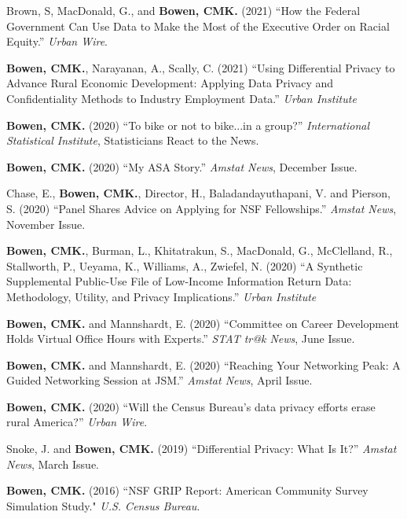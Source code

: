 \documentclass[11.5pt, letterpaper, roman]{moderncv} %
\begin{document}
\begin{etaremune}[topsep=0pt, itemsep=8pt, partopsep=0pt, parsep=0pt]
    \item Brown, S, MacDonald, G., and \textbf{Bowen, CMK.} (2021) ``How the Federal Government Can Use Data to Make the Most of the Executive Order on Racial Equity.'' \textit{Urban Wire}. 

    \item \textbf{Bowen, CMK.}, Narayanan, A., Scally, C. (2021) ``Using Differential Privacy to Advance Rural Economic Development: Applying Data Privacy and Confidentiality Methods to Industry Employment Data.'' \textit{Urban Institute}

    \item \textbf{Bowen, CMK.} (2020) ``To bike or not to bike...in a group?'' \textit{International Statistical Institute}, Statisticians React to the News.

    \item \textbf{Bowen, CMK.} (2020) ``My ASA Story.'' \textit{Amstat News}, December Issue.

    \item Chase, E., \textbf{Bowen, CMK.}, Director, H., Baladandayuthapani, V. and Pierson, S. (2020) ``Panel Shares Advice on Applying for NSF Fellowships.'' \textit{Amstat News}, November Issue.

    \item \textbf{Bowen, CMK.}, Burman, L., Khitatrakun, S., MacDonald, G., McClelland, R., Stallworth, P., Ueyama, K., Williams, A., Zwiefel, N. (2020) ``A Synthetic Supplemental Public-Use File of Low-Income Information Return Data: Methodology, Utility, and Privacy Implications.'' \textit{Urban Institute}

    \item \textbf{Bowen, CMK.} and Mannshardt, E. (2020) ``Committee on Career Development Holds Virtual Office Hours with Experts.'' \textit{STAT tr@k News}, June Issue.

    \item \textbf{Bowen, CMK.} and Mannshardt, E. (2020) ``Reaching Your Networking Peak: A Guided Networking Session at JSM.'' \textit{Amstat News}, April Issue.
    
    \item \textbf{Bowen, CMK.} (2020) ``Will the Census Bureau's data privacy efforts erase rural America?'' \textit{Urban Wire}. 
    
    \item Snoke, J. and \textbf{Bowen, CMK.} (2019) ``Differential Privacy: What Is It?'' \textit{Amstat News}, March Issue.
    
    \item \textbf{Bowen, CMK.} (2016) ``NSF GRIP Report: American Community Survey Simulation Study." \textit{U.S. Census Bureau}.  
\end{etaremune}
\end{document}
